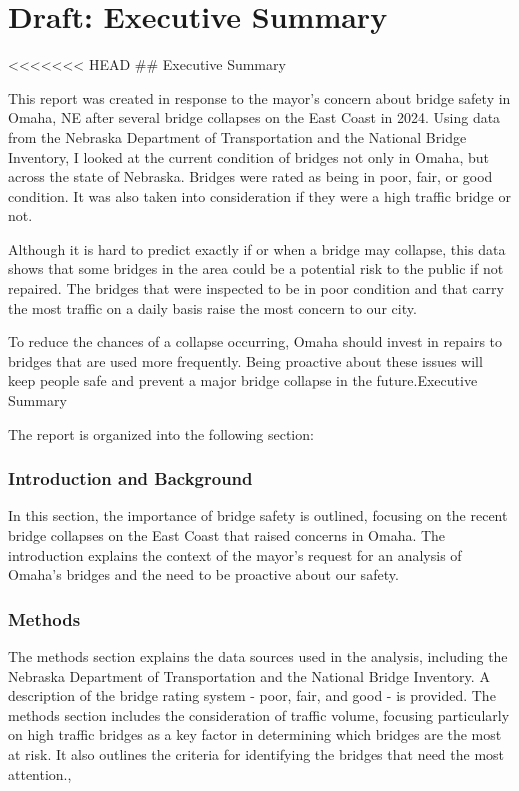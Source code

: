 \documentclass[
  letterpaper,
  DIV=11,
  numbers=noendperiod]{scrreprt}
\begin{document}
\chapter{Draft: Executive Summary}\label{draft-executive-summary}

\textless\textless\textless\textless\textless\textless\textless{} HEAD
\#\# Executive Summary

This report was created in response to the mayor's concern about bridge
safety in Omaha, NE after several bridge collapses on the East Coast in
2024. Using data from the Nebraska Department of Transportation and the
National Bridge Inventory, I looked at the current condition of bridges
not only in Omaha, but across the state of Nebraska. Bridges were rated
as being in poor, fair, or good condition. It was also taken into
consideration if they were a high traffic bridge or not.

Although it is hard to predict exactly if or when a bridge may collapse,
this data shows that some bridges in the area could be a potential risk
to the public if not repaired. The bridges that were inspected to be in
poor condition and that carry the most traffic on a daily basis raise
the most concern to our city.

To reduce the chances of a collapse occurring, Omaha should invest in
repairs to bridges that are used more frequently. Being proactive about
these issues will keep people safe and prevent a major bridge collapse
in the future.Executive Summary

The report is organized into the following section:

\subsection{Introduction and
Background}\label{introduction-and-background-1}

In this section, the importance of bridge safety is outlined, focusing
on the recent bridge collapses on the East Coast that raised concerns in
Omaha. The introduction explains the context of the mayor's request for
an analysis of Omaha's bridges and the need to be proactive about our
safety.

\subsection{Methods}\label{methods-3}

The methods section explains the data sources used in the analysis,
including the Nebraska Department of Transportation and the National
Bridge Inventory. A description of the bridge rating system - poor,
fair, and good - is provided. The methods section includes the
consideration of traffic volume, focusing particularly on high traffic
bridges as a key factor in determining which bridges are the most at
risk. It also outlines the criteria for identifying the bridges that
need the most attention.,
\end{document}
